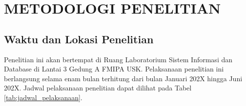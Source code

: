 
\chapter{METODOLOGI PENELITIAN}

\section{Waktu dan Lokasi Penelitian}
Penelitian ini akan bertempat di Ruang Laboratorium Sistem Informasi dan Database di Lantai 3 Gedung A FMIPA USK. Pelaksanaan penelitian ini berlangsung selama enam bulan terhitung  dari bulan Januari 202X hingga Juni 202X. Jadwal pelaksanaan penelitian dapat dilihat pada Tabel \ref{tab:jadwal_pelaksanaan}.







